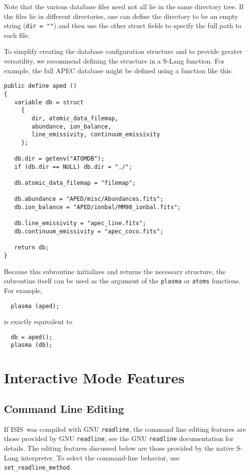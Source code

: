 \documentclass{book}
\newcommand{\isisx}{{\sc ISIS~}}
\begin{document}
Note that the various database files need not all lie in the same
directory tree. If the files lie in different directories, one can
define the directory to be an empty string ({\tt dir = ""}) and
then use the other struct fields to specify the full path to each
file.

To simplify creating the database configuration structure and to
provide greater versatility, we recommend defining the structure
in a S-Lang function.  For example, the full APEC database might
be defined using a function like this:
\begin{verbatim}
public define aped ()
{
   variable db = struct
     {
        dir, atomic_data_filemap,
        abundance, ion_balance,
        line_emissivity, continuum_emissivity
     };

   db.dir = getenv("ATOMDB");
   if (db.dir == NULL) db.dir = "./";

   db.atomic_data_filemap = "filemap";

   db.abundance = "APED/misc/Abundances.fits";
   db.ion_balance = "APED/ionbal/MM98_ionbal.fits";

   db.line_emissivity = "apec_line.fits";
   db.continuum_emissivity = "apec_coco.fits";

   return db;
}
\end{verbatim}
Because this subroutine initializes and returns the necessary
structure, the subroutine itself can be used as the argument
of the {\tt plasma} or {\tt atoms} functions.  For example,
\begin{verbatim}
  plasma (aped);
\end{verbatim}
is exactly equivalent to
\begin{verbatim}
  db = aped();
  plasma (db);
\end{verbatim}

\chapter{Interactive Mode Features}
\label{chap:interactive}

\section{Command Line Editing}

If \isisx was compiled with GNU \verb|readline|, the command
line editing features are those provided by GNU
\verb|readline|; see the GNU \verb|readline| documentation for
details.  The editing features discussed below are those
provided by the native S-Lang interpreter.  To select the
command-line behavior, use \verb|set_readline_method|.
\end{document}
